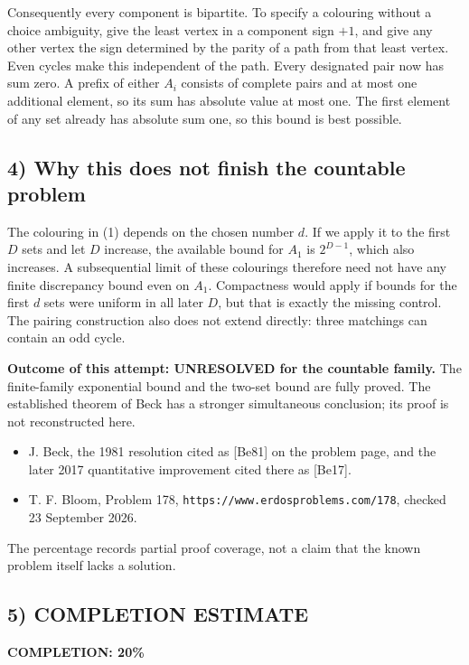 Consequently every component is bipartite. To specify a colouring
without a choice ambiguity, give the least vertex in a component sign
$+1$, and give any other vertex the sign determined by the parity of
a path from that least vertex. Even cycles make this independent of
the path. Every designated pair now has sum zero. A prefix of either
$A_i$ consists of complete pairs and at most one additional element,
so its sum has absolute value at most one. The first element of any
set already has absolute sum one, so this bound is best possible.

\subsection{4) Why this does not finish the countable problem}
The colouring in (1) depends on the chosen number $d$. If we apply it
to the first $D$ sets and let $D$ increase, the available bound for
$A_1$ is $2^{D-1}$, which also increases. A subsequential limit of
these colourings therefore need not have any finite discrepancy bound
even on $A_1$. Compactness would apply if bounds for the first $d$ sets
were uniform in all later $D$, but that is exactly the missing control.
The pairing construction also does not extend directly: three matchings
can contain an odd cycle.

\textbf{Outcome of this attempt: UNRESOLVED for the countable family.}
The finite-family exponential bound and the two-set bound are fully
proved. The established theorem of Beck has a stronger simultaneous
conclusion; its proof is not reconstructed here.
\begin{itemize}
\item J. Beck, the 1981 resolution cited as [Be81] on the problem page,
and the later 2017 quantitative improvement cited there as [Be17].
\item T. F. Bloom, Problem 178,
\texttt{https://www.erdosproblems.com/178}, checked 23 September 2026.
\end{itemize}
The percentage records partial proof coverage, not a claim that the
known problem itself lacks a solution.
\subsection{5) COMPLETION ESTIMATE}
\textbf{COMPLETION: 20\%}
